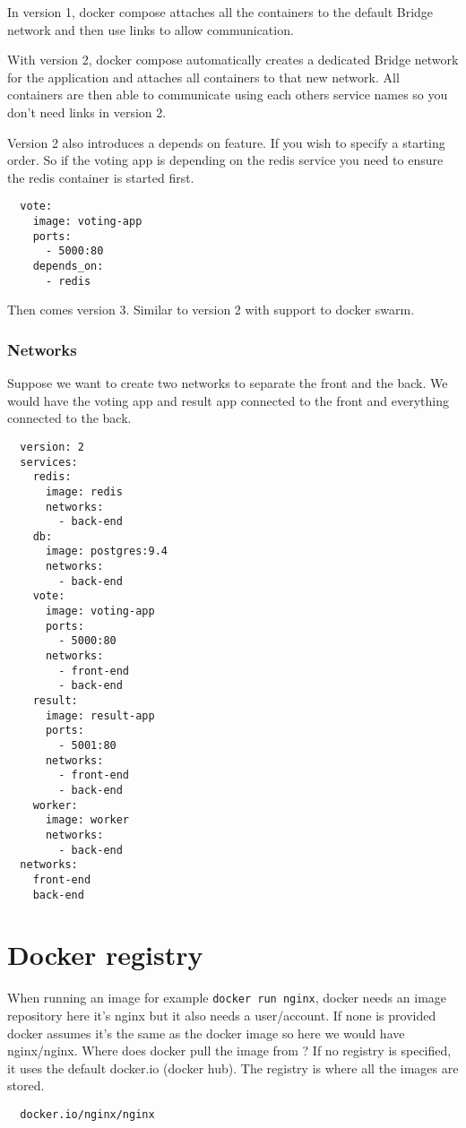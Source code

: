 \documentclass[french]{article}
\begin{document}
In version 1, docker compose attaches all the containers to the default Bridge network and then use links to allow communication.

With version 2, docker compose automatically creates a dedicated Bridge network for the application and attaches all containers to that new network. All containers are then able to communicate using each others service names so you don't need links in version 2.

Version 2 also introduces a depends on feature. If you wish to specify a starting order. So if the voting app is depending on the redis service you need to ensure the redis container is started first.
\begin{verbatim}
  vote:
    image: voting-app
    ports:
      - 5000:80
    depends_on:
      - redis
\end{verbatim}

Then comes version 3. Similar to version 2 with support to docker swarm.

\subsubsection{Networks}

Suppose we want to create two networks to separate the front and the back. We would have the voting app and result app connected to the front and everything connected to the back.

\begin{verbatim}
  version: 2
  services:
    redis:
      image: redis
      networks:
        - back-end
    db:
      image: postgres:9.4
      networks:
        - back-end
    vote:
      image: voting-app
      ports:
        - 5000:80
      networks:
        - front-end
        - back-end
    result:
      image: result-app
      ports:
        - 5001:80
      networks:
        - front-end
        - back-end
    worker:
      image: worker
      networks:
        - back-end
  networks:
    front-end
    back-end
\end{verbatim}

\section{Docker registry}

When running an image for example \verb|docker run nginx|, docker needs an image repository here it's nginx but it also needs a user/account. If none is provided docker assumes it's the same as the docker image so here we would have nginx/nginx. Where does docker pull the image from ? If no registry is specified, it uses the default docker.io (docker hub). The registry is where all the images are stored.
\begin{verbatim}
  docker.io/nginx/nginx
\end{verbatim}
\end{document}
